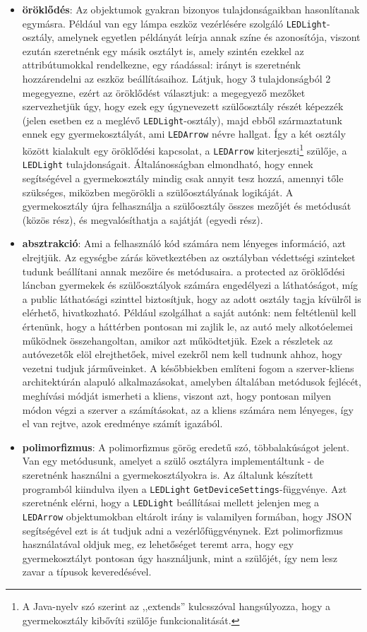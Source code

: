\documentclass[tocnopagenum]{thesis-ekf}
\begin{document}
\begin{itemize}
		\item \textbf{öröklődés}: Az objektumok gyakran bizonyos tulajdonságaikban hasonlítanak egymásra. Például van egy lámpa eszköz vezérlésére szolgáló \verb*|LEDLight|-osztály, amelynek egyetlen példányát leírja annak színe és azonosítója, viszont ezután szeretnénk egy másik osztályt is, amely szintén ezekkel az attribútumokkal rendelkezne, egy ráadással: irányt is szeretnénk hozzárendelni az eszköz beállításaihoz. Látjuk, hogy 3 tulajdonságból 2 megegyezne, ezért az öröklődést választjuk: a megegyező mezőket szervezhetjük úgy, hogy ezek egy úgynevezett szülőosztály részét képezzék (jelen esetben ez a meglévő \verb*|LEDLight|-osztály), majd ebből származtatunk ennek egy gyermekosztályát, ami \verb*|LEDArrow|  névre hallgat. Így a két osztály között kialakult egy öröklődési kapcsolat, a \verb*|LEDArrow| kiterjeszti\footnote{A Java-nyelv szó szerint az ,,extends'' kulcsszóval hangsúlyozza, hogy a gyermekosztály kibővíti szülője funkcionalitását.} szülője, a \verb*|LEDLight| tulajdonságait. Általánosságban elmondható, hogy ennek segítségével a gyermekosztály mindig csak annyit tesz hozzá, amennyi tőle szükséges, miközben megörökli a szülőosztályának logikáját.
		A gyermekosztály újra felhasználja a szülőosztály összes mezőjét és metódusát (közös rész), és megvalósíthatja a sajátját (egyedi rész).
		\item \textbf{absztrakció}: Ami a felhasználó kód számára nem lényeges információ, azt elrejtjük. Az egységbe zárás következtében az osztályban védettségi szinteket tudunk beállítani annak mezőire és metódusaira. a protected az öröklődési láncban gyermekek és szülőosztályok számára engedélyezi a láthatóságot, míg a public láthatósági szinttel biztosítjuk, hogy az adott osztály tagja kívülről is elérhető, hivatkozható. Például szolgálhat a saját autónk: nem feltétlenül kell értenünk, hogy a háttérben pontosan mi zajlik le, az autó mely alkotóelemei működnek összehangoltan, amikor azt működtetjük. Ezek a részletek az autóvezetők elöl elrejthetőek, mivel ezekről nem kell tudnunk ahhoz, hogy vezetni tudjuk járműveinket. A későbbiekben említeni fogom a szerver-kliens architektúrán alapuló alkalmazásokat, amelyben általában metódusok fejlécét, meghívási módját ismerheti a kliens, viszont azt, hogy pontosan milyen módon végzi a szerver a számításokat, az a kliens számára nem lényeges, így el van rejtve, azok eredménye számít igazából.
		
		\item \textbf{polimorfizmus}: A polimorfizmus görög eredetű szó, többalakúságot jelent. Van egy metódusunk, amelyet a szülő osztályra implementáltunk - de szeretnénk használni a gyermekosztályokra is. Az általunk készített programból kiindulva ilyen a \verb*|LEDLight| \verb*|GetDeviceSettings|-függvénye. Azt szeretnénk elérni, hogy a \verb*|LEDLight| beállításai mellett jelenjen meg a \verb*|LEDArrow| objektumokban eltárolt irány is valamilyen formában, hogy JSON segítségével ezt is át tudjuk adni a vezérlőfüggvénynek. Ezt polimorfizmus használatával oldjuk meg, ez lehetőséget teremt arra, hogy egy gyermekosztályt pontosan úgy használjunk, mint a szülőjét, így nem lesz zavar a típusok keveredésével.\cite{oop_concepts}
	\end{itemize}
\end{document}
